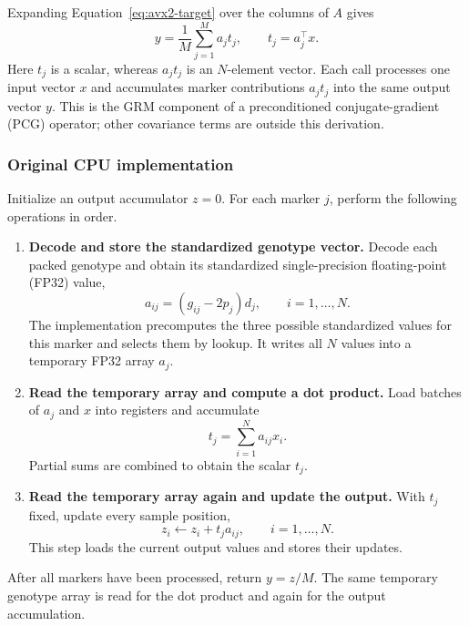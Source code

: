 \documentclass{article}
\begin{document}
Expanding Equation~\eqref{eq:avx2-target} over the columns of $A$ gives
\begin{equation}
 y=\frac{1}{M}\sum_{j=1}^{M}a_jt_j,
 \qquad t_j=a_j^\top x.
 \label{eq:avx2-marker}
\end{equation}
Here $t_j$ is a scalar, whereas $a_jt_j$ is an $N$-element vector.
Each call processes one input vector $x$ and accumulates marker
contributions $a_jt_j$ into the same output vector $y$.
This is the GRM component of a preconditioned conjugate-gradient
(PCG) operator; other covariance terms are outside this derivation.

\subsubsection{Original CPU implementation}

Initialize an output accumulator $z=0$. For each marker $j$, perform
the following operations in order.
\begin{enumerate}
 \item \textbf{Decode and store the standardized genotype vector.}
 Decode each packed genotype and obtain its standardized
 single-precision floating-point (FP32) value,
 \begin{equation}
  a_{ij}=(g_{ij}-2p_j)d_j,\qquad i=1,\ldots,N.
 \end{equation}
 The implementation precomputes the three possible standardized values
 for this marker and selects them by lookup. It writes all $N$ values
 into a temporary FP32 array $a_j$.

 \item \textbf{Read the temporary array and compute a dot product.}
 Load batches of $a_j$ and $x$ into registers and accumulate
 \begin{equation}
  t_j=\sum_{i=1}^{N}a_{ij}x_i.
 \end{equation}
 Partial sums are combined to obtain the scalar $t_j$.

 \item \textbf{Read the temporary array again and update the output.}
 With $t_j$ fixed, update every sample position,
 \begin{equation}
  z_i\leftarrow z_i+t_ja_{ij},\qquad i=1,\ldots,N.
 \end{equation}
 This step loads the current output values and stores their updates.
\end{enumerate}
After all markers have been processed, return $y=z/M$.
The same temporary genotype array is read for the dot product and
again for the output accumulation.
\end{document}
